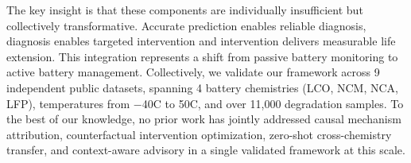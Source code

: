 \documentclass[5p,times,authoryear]{elsarticle}
\begin{document}
The key insight is that these components are individually insufficient but collectively transformative. Accurate prediction enables reliable diagnosis, diagnosis enables targeted intervention and intervention delivers measurable life extension. This integration represents a shift from passive battery monitoring to active battery management. Collectively, we validate our framework across 9 independent public datasets, spanning 4 battery chemistries (LCO, NCM, NCA, LFP), temperatures from $-$40\textdegree{}C to 50\textdegree{}C, and over 11,000 degradation samples. To the best of our knowledge, no prior work has jointly addressed causal mechanism attribution, counterfactual intervention optimization, zero-shot cross-chemistry transfer, and context-aware advisory in a single validated framework at this scale.


\end{document}

